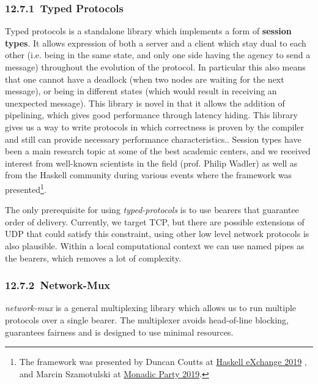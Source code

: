 \documentclass[]{article}
\begin{document}
\hypertarget{typed-protocols}{%
\subsubsection{​12.7.1​~Typed Protocols}\label{typed-protocols}}

Typed protocols is a standalone library which implements a form of
\textbf{session types}. It allows expression of both a server and a
client which stay dual to each other (i.e. being in the same state, and
only one side having the agency to send a message) throughout the
evolution of the protocol. In particular this also means that one cannot
have a deadlock (when two nodes are waiting for the next message), or
being in different states (which would result in receiving an unexpected
message). This library is novel in that it allows the addition of
pipelining, which gives good performance through latency hiding. This
library gives us a way to write protocols in which correctness is proven
by the compiler and still can provide necessary performance
characteristics.. Session types have been a main research topic at some
of the best academic centers, and we received interest from well-known
scientists in the field (prof. Philip Wadler) as well as from the
Haskell community during various events where the framework was
presented\footnote{The framework was presented by Duncan Coutts at
  \href{https://skillsmatter.com/skillscasts/14633-45-minute-talk-by-duncan-coutts}{{Haskell
  eXchange 2019}} , and Marcin Szamotulski at
  \href{https://www.youtube.com/watch?v=j8gza2L61nM}{{Monadic Party
  2019}}.}.

The only prerequisite for using \emph{typed-protocols} is to use bearers
that guarantee order of delivery. Currently, we target TCP, but there
are possible extensions of UDP that could satisfy this constraint, using
other low level network protocols is also plausible. Within a local
computational context we can use named pipes as the bearers, which
removes a lot of complexity.

\hypertarget{network-mux}{%
\subsubsection{​12.7.2​~Network-Mux}\label{network-mux}}

\emph{network-mux} is a general multiplexing library which allows us to
run multiple protocols over a single bearer. The multiplexer avoids
head-of-line blocking, guarantees fairness and is designed to use
minimal resources.
\end{document}
